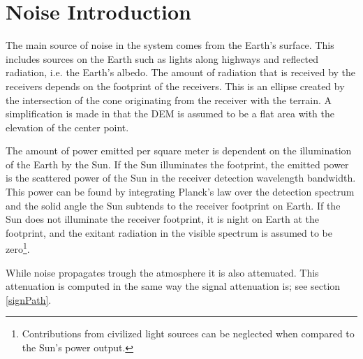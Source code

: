 \section{Noise Introduction}
\label{noise}

The main source of noise in the system comes from the Earth's surface. This includes sources on
the Earth such as lights along highways and reflected radiation, i.e. the Earth's albedo. The amount of
radiation that is received by the receivers depends on the footprint of the  receivers. This is an
ellipse created by the intersection of the cone originating from the receiver with the terrain. A
simplification is made in that the \ac{DEM} is assumed to be a flat area with the elevation of the
center point.
 
The amount of power emitted per square meter is dependent on the illumination of the Earth by the Sun. If the Sun
illuminates the footprint, the emitted power is the scattered power of the Sun in the receiver
detection wavelength bandwidth. This power can be found by integrating Planck's law over the detection spectrum and the solid angle the Sun subtends to the receiver footprint on Earth. If the Sun does not
illuminate the receiver footprint, it is night on Earth at the footprint, and the exitant radiation in the visible spectrum is assumed to be zero\footnote{Contributions from civilized light sources can be neglected when compared to the Sun's power output.}.

While noise propagates trough the atmosphere it is also attenuated. This attenuation is
computed in the same way the signal attenuation is; see section \ref{signPath}.
